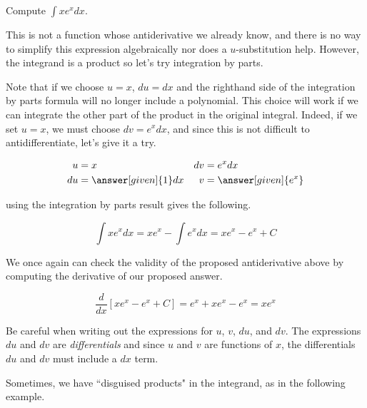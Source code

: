 \documentclass[noauthor]{ximera}
\begin{document}
\begin{example}
Compute $\int xe^{x} dx$.

\begin{explanation}
This is not a function whose antiderivative we already know, and there is no way to simplify this expression algebraically nor does a $u$-substitution help.  However, the integrand is a product so let's try integration by parts.  

Note that if we choose $u=x$, $du = dx$ and the righthand side of the integration by parts formula will no longer include a polynomial.  This choice will work if we can integrate the other part of the product in the original integral.  Indeed, if we set $u=x$, we must choose $dv=e^{x} dx$, and since this is not difficult to antidifferentiate, let's give it a try.

\begin{align*}
u &= x & dv & = e^x dx \\
 du &= \answer[given]{1} dx & v&= \answer[given]{e^x}
\end{align*}

using the integration by parts result gives the following.

\[
\int xe^{x} dx= xe^{x}-\int e^{x} dx=xe^{x}-e^{x} + C
\]

\end{explanation}

We once again can check the validity of the proposed antiderivative above by computing the derivative of our proposed answer.

\[
\frac{d}{dx} \left[xe^{x}-e^{x} + C\right] = e^x+xe^x -e^x = xe^x
\]

\end{example}

\begin{warning}
Be careful when writing out the expressions for $u$, $v$, $du$, and $dv$.  The expressions $du$ and $dv$ are \emph{differentials} and since $u$ and $v$ are functions of $x$, the differentials $du$ and $dv$ must include a $dx$ term.
\end{warning}

Sometimes, we have ``disguised products" in the integrand, as in the following example.
\end{document}
